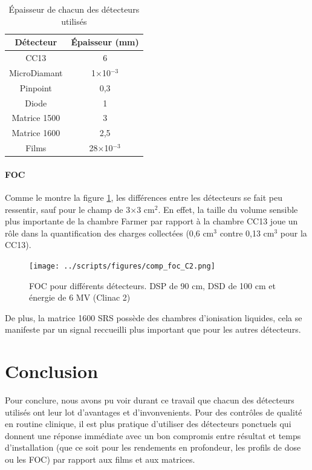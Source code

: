 \documentclass{book}
\begin{document}
\begin{table}[h]
  \centering
  \begin{tabular}{cc}
    \toprule
    \textbf{Détecteur} & \textbf{Épaisseur (mm)} \\
    \toprule
    CC13 & 6 \\
    MicroDiamant & 1$\times$10$^{-3}$  \\
    Pinpoint & 0,3  \\
    Diode & 1  \\
    Matrice 1500 & 3 \\
    Matrice 1600 & 2,5 \\
    Films & 28$\times$10$^{-3}$ \\
    \bottomrule
  \end{tabular}
  \caption{Épaisseur de chacun des détecteurs utilisés}
  \label{table_epaisseurs_detecteurs}
\end{table}

\subsubsection{FOC}

Comme le montre la figure \ref*{fig_comp_foc_X6}, les différences entre les détecteurs se fait peu ressentir, sauf pour le champ de 3$\times$3 cm$^2$. En effet, la taille du volume sensible plus importante de la chambre Farmer par rapport à la chambre CC13 joue un rôle dans la quantification des charges collectées (0,6 cm$^3$ contre 0,13 cm$^3$ pour la CC13).

\begin{figure}[h]
  \centering
  \texttt{[image: ../scripts/figures/comp\_foc\_C2.png]}
  \caption{FOC pour différents détecteurs. DSP de 90 cm, DSD de 100 cm et énergie de 6 MV (Clinac 2)}
  \label{fig_comp_foc_X6}
\end{figure}

De plus, la matrice 1600 SRS possède des chambres d'ionisation liquides, cela se manifeste par un signal reccueilli plus important que pour les autres détecteurs.

\chapter{Conclusion}

Pour conclure, nous avons pu voir durant ce travail que chacun des détecteurs utilisés ont leur lot d'avantages et d'invonvenients. Pour des contrôles de qualité en routine clinique, il est plus pratique d'utiliser des détecteurs ponctuels qui donnent une réponse immédiate avec un bon compromis entre résultat et temps d'installation (que ce soit pour les rendements en profondeur, les profils de dose ou les FOC) par rapport aux films et aux matrices.
\end{document}
